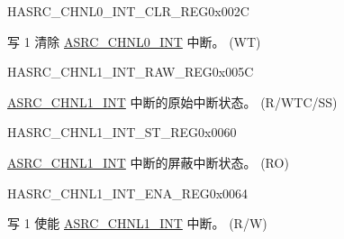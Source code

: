 \begin{register}{H}{ASRC\_CHNL0\_INT\_CLR\_REG}{0x002C}\label{regdesc:ASRCCHNL0INTCLRREG}
%
%
\regnewline%
\begin{regdesc}\begin{reglist}
\label{fielddesc:ASRCCHNL0OUTCNTEOFINTCLR}\item [ASRC\_CHNL0\_OUTCNT\_EOF\_INT\_CLR] 写 1 清除 \hyperref[int:ASRCCHNL0INT] {ASRC\_CHNL0\_INT} 中断。 (WT)
\end{reglist}\end{regdesc}
\end{register}


\begin{register}{H}{ASRC\_CHNL1\_INT\_RAW\_REG}{0x005C}\label{regdesc:ASRCCHNL1INTRAWREG}
%
%
\regnewline%
\begin{regdesc}\begin{reglist}
\label{fielddesc:ASRCCHNL1OUTCNTEOFINTRAW}\item [ASRC\_CHNL1\_OUTCNT\_EOF\_INT\_RAW] \hyperref[int:ASRCCHNL1INT] {ASRC\_CHNL1\_INT} 中断的原始中断状态。 (R/WTC/SS)
\end{reglist}\end{regdesc}
\end{register}


\begin{register}{H}{ASRC\_CHNL1\_INT\_ST\_REG}{0x0060}\label{regdesc:ASRCCHNL1INTSTREG}
%
%
\regnewline%
\begin{regdesc}\begin{reglist}
\label{fielddesc:ASRCCHNL1OUTCNTEOFINTST}\item [ASRC\_CHNL1\_OUTCNT\_EOF\_INT\_ST] \hyperref[int:ASRCCHNL1INT] {ASRC\_CHNL1\_INT} 中断的屏蔽中断状态。 (RO)
\end{reglist}\end{regdesc}
\end{register}


\begin{register}{H}{ASRC\_CHNL1\_INT\_ENA\_REG}{0x0064}\label{regdesc:ASRCCHNL1INTENAREG}
%
%
\regnewline%
\begin{regdesc}\begin{reglist}
\label{fielddesc:ASRCCHNL1OUTCNTEOFINTENA}\item [ASRC\_CHNL1\_OUTCNT\_EOF\_INT\_ENA] 写 1 使能 \hyperref[int:ASRCCHNL1INT] {ASRC\_CHNL1\_INT} 中断。 (R/W)
\end{reglist}\end{regdesc}
\end{register}


